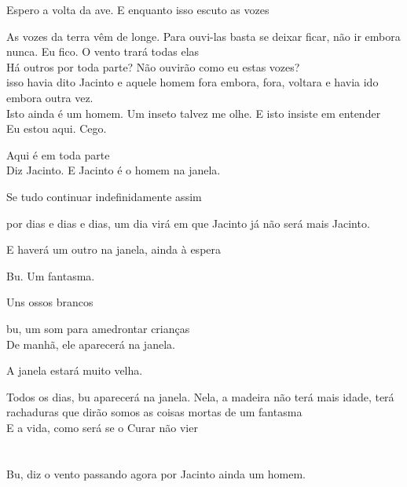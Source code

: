 \pagebreak

Espero a volta da ave. E enquanto isso escuto as vozes

As vozes da terra vêm de longe. Para ouvi-las basta se deixar ficar, não
ir embora nunca. Eu fico. O vento trará todas elas\\

Há outros por toda parte? Não ouvirão como eu estas vozes?\\

isso havia dito Jacinto e aquele homem fora embora, fora, voltara e
havia ido embora outra vez.\\

Isto ainda é um homem. Um inseto talvez me olhe. E isto insiste em
entender\\

Eu estou aqui. Cego.

Aqui é em toda parte\\

Diz Jacinto. E Jacinto é o homem na janela.

\pagebreak

\clearpage
\thispagestyle{empty}

\movetooddpage

Se tudo continuar indefinidamente assim

por dias e dias e dias, um dia virá em que Jacinto já não será mais
Jacinto.

E haverá um outro na janela, ainda à espera

Bu. Um fantasma.

Uns ossos brancos

bu, um som para amedrontar crianças\\

De manhã, ele aparecerá na janela.

A janela estará muito velha.

Todos os dias, bu aparecerá na janela. Nela, a madeira não terá mais
idade, terá rachaduras que dirão somos as coisas mortas de um fantasma\\

E a vida, como será se o Curar não vier

\pagebreak
\pagecolor{black}

\chapter*{}
\pagecolor{black}\afterpage{\nopagecolor}


\movetoevenpage
Bu, diz o vento passando agora por Jacinto ainda um homem.

